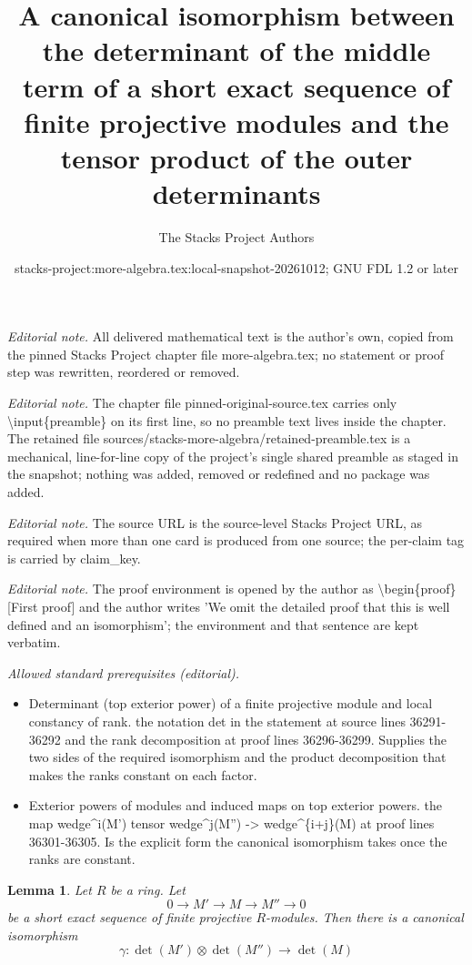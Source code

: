 \documentclass[10pt,a4paper]{amsart}
\title{A canonical isomorphism between the determinant of the middle term of a short exact sequence of finite projective modules and the tensor product of the outer determinants}
\author{The Stacks Project Authors}
\date{stacks-project:more-algebra.tex:local-snapshot-20261012; GNU FDL 1.2 or later}
\theoremstyle{plain}
\newtheorem{lemma}[subsection]{Lemma}
\theoremstyle{definition}
\theoremstyle{remark}
\numberwithin{equation}{subsection}
\begin{document}
\maketitle
\setcounter{subsection}{1}
\noindent\textit{Editorial note.} All delivered mathematical text is the author's own, copied from the pinned Stacks Project chapter file more-algebra.tex; no statement or proof step was rewritten, reordered or removed.\par\medskip
\noindent\textit{Editorial note.} The chapter file pinned-original-source.tex carries only \textbackslash{}input\{preamble\} on its first line, so no preamble text lives inside the chapter. The retained file sources/stacks-more-algebra/retained-preamble.tex is a mechanical, line-for-line copy of the project's single shared preamble as staged in the snapshot; nothing was added, removed or redefined and no package was added.\par\medskip
\noindent\textit{Editorial note.} The source URL is the source-level Stacks Project URL, as required when more than one card is produced from one source; the per-claim tag is carried by claim\_key.\par\medskip
\noindent\textit{Editorial note.} The proof environment is opened by the author as \textbackslash{}begin\{proof\}[First proof] and the author writes 'We omit the detailed proof that this is well defined and an isomorphism'; the environment and that sentence are kept verbatim.\par\medskip
\noindent\textit{Allowed standard prerequisites (editorial).}\begin{itemize}
\item Determinant (top exterior power) of a finite projective module and local constancy of rank. the notation det in the statement at source lines 36291-36292 and the rank decomposition at proof lines 36296-36299. Supplies the two sides of the required isomorphism and the product decomposition that makes the ranks constant on each factor.
\item Exterior powers of modules and induced maps on top exterior powers. the map wedge\textasciicircum{}i(M') tensor wedge\textasciicircum{}j(M'') -> wedge\textasciicircum{}\{i+j\}(M) at proof lines 36301-36305. Is the explicit form the canonical isomorphism takes once the ranks are constant.
\end{itemize}\medskip
\begin{lemma}
\label{lemma-det-ses}
Let $R$ be a ring. Let
$$
0 \to M' \to M \to M'' \to 0
$$
be a short exact sequence of finite projective $R$-modules. Then there
is a canonical isomorphism
$$
\gamma : \det(M') \otimes \det(M'') \longrightarrow \det(M)
$$
\end{lemma}
\end{document}
